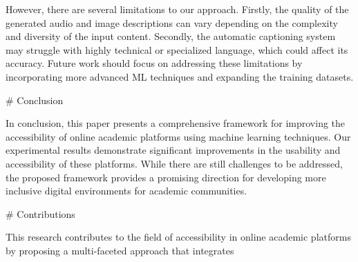 However, there are several limitations to our approach. Firstly, the quality of the generated audio and image descriptions can vary depending on the complexity and diversity of the input content. Secondly, the automatic captioning system may struggle with highly technical or specialized language, which could affect its accuracy. Future work should focus on addressing these limitations by incorporating more advanced ML techniques and expanding the training datasets.

# Conclusion

In conclusion, this paper presents a comprehensive framework for improving the accessibility of online academic platforms using machine learning techniques. Our experimental results demonstrate significant improvements in the usability and accessibility of these platforms. While there are still challenges to be addressed, the proposed framework provides a promising direction for developing more inclusive digital environments for academic communities.

# Contributions

This research contributes to the field of accessibility in online academic platforms by proposing a multi-faceted approach that integrates